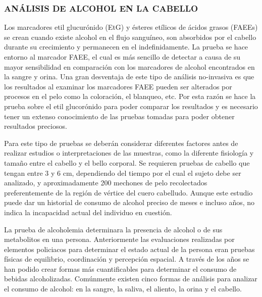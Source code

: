 \subsubsection{ANÁLISIS DE ALCOHOL EN LA CABELLO}
Los marcadores etil glucurónido (EtG) y ésteres etílicos de ácidos grasos (FAEEs) se crean cuando existe alcohol en el flujo sanguíneo, son absorbidos por el cabello durante su crecimiento y permanecen en el indefinidamente. La prueba se hace entorno al marcador FAEE, el cual es más sencillo de detectar a causa de su mayor sensibilidad en comparación con los marcadores de alcohol encontrados en la sangre y orina. Una gran desventaja de este tipo de análisis no-invasiva es que los resultados al examinar los marcadores FAEE pueden ser alterados por procesos en el pelo como la coloración, el blanqueo, etc. Por esta razón se hace la prueba sobre el etil glucorónido para poder comparar los resultados y es necesario tener un extenso conocimiento de las pruebas tomadas para poder obtener resultados preciosos. \par
Para este tipo de pruebas se deberán considerar diferentes factores antes de realizar estudios o interpretaciones de las muestras, como la diferente fisiología y tamaño entre el cabello y el bello corporal. Se requieren pruebas de cabello que tengan entre 3 y 6 cm, dependiendo del tiempo por el cual el sujeto debe ser analizado, y aproximadamente 200 mechones de pelo recolectados preferentemente de la región de vértice del cuero cabelludo. Aunque este estudio puede dar un historial de consumo de alcohol preciso de meses e incluso años, no indica la incapacidad actual del individuo en cuestión.\par
La prueba de alcoholemia determinara la presencia de alcohol o de sus metabolitos en una persona. Anteriormente las evaluaciones realizadas por elementos policiacos para determinar el estado actual de la persona eran pruebas físicas de equilibrio, coordinación y percepción espacial.  A través de los años se han podido crear formas más cuantificables para determinar el consumo de bebidas alcoholizadas. Comúnmente existen cinco formas de análisis para analizar el consumo de alcohol: en la sangre, la saliva, el aliento, la orina y el cabello.
